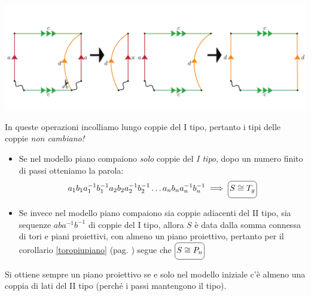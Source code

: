 \begin{demonstration}
\begin{enumerate}
	\vspace{-3mm}
	\begin{center}
		\includegraphics[trim=0cm 0cm 0cm 0cm, clip, scale=0.35]{images/cutandpastealgorithmstep4-4.pdf}
	\end{center}
	\vspace{-3mm}
\end{enumerate}
In queste operazioni incolliamo lungo coppie del I tipo, pertanto i tipi delle coppie \textit{non cambiano!}\\
\begin{itemize}
	\item Se nel modello piano compaiono \textit{solo} coppie del \textit{I tipo}, dopo un numero finito di passi otteniamo la parola:
	\begin{equation}
		a_1b_1a_1^{-1}b_1^{-1}a_2b_2a_2^{-1}b_2^{-1}\ldots a_nb_na_n^{-1}b_n^{-1}\implies \ovaled{S\cong T_g}
	\end{equation}
\item Se invece nel modello piano compaiono sia coppie adiacenti del II tipo, sia sequenze $aba^{-1}b^{-1}$ di coppie del I tipo, allora $S$ è data dalla somma connessa di tori e piani proiettivi, con almeno un piano proiettivo, pertanto per il corollario \ref{toropiupiano} (pag. \pageref{toropiupiano}) segue che $\ovaled{S\cong P_n}$
\end{itemize}
\vspace{-3mm}
\end{demonstration}
\begin{observe}
	Si ottiene sempre un piano proiettivo se e solo nel modello iniziale c'è almeno una coppia di lati del II tipo (perché i passi mantengono il tipo).
\end{observe}
